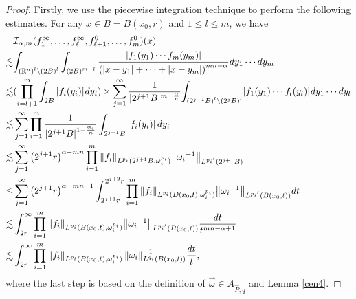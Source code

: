 \documentclass[11pt, twoside, leqno]{article}
\begin{document}
\begin{proof}[Proof]
	Firstly, we use the piecewise integration technique to perform the following estimates. For any $x \in B=B(x_0,r)$ and $1 \le l \le m$, we have
	\begin{align}\label{ieq6}
	&{{\mathcal I}_{\alpha,m}}(f_1^\infty , \ldots ,f_\ell ^\infty ,f_{\ell  + 1}^0, \ldots ,f_m^0)(x)\notag\\ 
	\lesssim& {\int _{{{({{\mathbb R^n}})}^l }\backslash {{(2B)}^l }}}\int_{{{(2B)}^{m -l }}} {\frac{{|{f_1}({y_1}) \cdots {f_m}({y_m})|}}{{{{(|x - {y_1}| +  \cdots  + |x - {y_m}|)}^{mn - \alpha }}}}} d{y_1} \cdots d{y_m}\notag\\ 
	\lesssim& (\prod\limits_{i =l  + 1}^m {\int_{2B} | } {f_i}({y_i})|{\mkern 1mu} d{y_i}) \times \sum\limits_{j = 1}^\infty  {\frac{1}{{|{2^{j + 1}}B{|^{m - \frac{\alpha }{n}}}}}} {\int _{{{({2^{j + 1}}B)}^l }\backslash {{({2^j}B)}^l }}}|{f_1}({y_1}) \cdots {f_l }({y_l })|{\mkern 1mu} d{y_1} \cdots d{y_l }\notag\\ 
	\lesssim &\sum\limits_{j = 1}^\infty  {\prod\limits_{i = 1}^m {\frac{1}{{{{\left| {{2^{j + 1}}B} \right|}^{1 - \frac{\alpha_i }{{n}}}}}}} \int_{{2^{j + 1}}B} {\left| {{f_i}({y_i})} \right|d{y_i}} }\\
	\lesssim&\sum\limits_{j = 1}^\infty  {{{\left( {{2^{j + 1}}r} \right)}^{\alpha  - mn}}\prod\limits_{i = 1}^m {{{\left\| {{f_i}} \right\|}_{{L^{{p_i}}}({2^{j + 1}}B,\omega _i^{{p_i}})}}{{\left\| {{\omega _i}^{ - 1}} \right\|}_{{L^{{p_i}^\prime }}({2^{j + 1}}B)}}} }\notag\\
	\le&\sum\limits_{j = 1}^\infty  {{{\left( {{2^{j + 1}}r} \right)}^{\alpha  - mn - 1}}\int_{{2^{j + 1}}r}^{{2^{j + 2}}r} {\prod\limits_{i = 1}^m {{{\left\| {{f_i}} \right\|}_{{L^{{p_i}}}(D({x_0},t),\omega _i^{{p_i}})}}{{\left\| {{\omega _i}^{ - 1}} \right\|}_{{L^{{p_i}^\prime }}(B({x_0},t))}}} dt} }\notag\\
	\lesssim&\int_{2r}^\infty  {\prod\limits_{i = 1}^m {{{\left\| {{f_i}} \right\|}_{{L^{{p_i}}}(B({x_0},t),\omega _i^{{p_i}})}}{{\left\| {{\omega _i}^{ - 1}} \right\|}_{{L^{{p_i}^\prime }}(B({x_0},t))}}} \frac{{dt}}{{{t^{mn - \alpha  + 1}}}}} \notag\\
	\lesssim&\int_{2r}^\infty  {\prod\limits_{i = 1}^m {{{\left\| {{f_i}} \right\|}_{{L^{{p_i}}}(B({x_0},t),\omega _i^{{p_i}})}}\left\| {{\omega _i}} \right\|_{{L^{{q_i}}}(B({x_0},t))}^{ - 1}} \frac{{dt}}{t}},
	\end{align}
	where the last step is based on the definition of $\vec{\omega} \in {A_{\vec P,q}}$ and Lemma \ref{cen4}. 
	

\end{proof}
\end{document}
